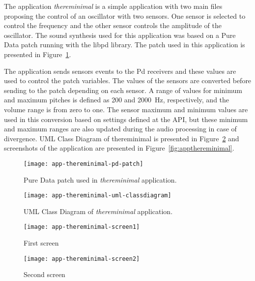 The application \textit{thereminimal} is a simple application with two main files proposing the control of an oscillator with two sensors.
One sensor is selected to control the frequency and the other sensor controls the amplitude of the oscillator.
The sound synthesis used for this application was based on a Pure Data patch running with the libpd library.
The patch used in this application is presented in Figure~\ref{fig:thereminimal-pd-patch}.

The application sends sensors events to the Pd receivers and these values are used to control the patch variables.
The values of the sensors are converted before sending to the patch depending on each sensor.
A range of values for minimum and maximum pitches is defined as 200 and 2000~Hz, respectively, and the volume range is from zero to one.
The sensor maximum and minimum values are used in this conversion based on settings defined at the API, but these minimum and maximum ranges are also updated during the audio processing in case of divergence.
UML Class Diagram of thereminimal is presented in Figure~\ref{fig:thereminimal-uml-classdiagram} and screenshots of the application are presented in Figure~\ref{fig:appthereminimal}.

\begin{figure}[!ht]
	\centering
	\texttt{[image: app-thereminimal-pd-patch]}
	\caption{Pure Data patch used in \textit{thereminimal} application.}
	\label{fig:thereminimal-pd-patch}
\end{figure}

\begin{figure}[!ht]
	\centering
	\texttt{[image: app-thereminimal-uml-classdiagram]}
	\caption{UML Class Diagram of \textit{thereminimal} application.}
	\label{fig:thereminimal-uml-classdiagram}
\end{figure}

\begin{figure*}[!ht]
	\centering
	\begin{subfigure}{.30\textwidth}
		\texttt{[image: app-thereminimal-screen1]}
		\caption{First screen}
		\label{fig:appthereminimalfirstscreen}
	\end{subfigure}
	\begin{subfigure}{.30\textwidth}
		\texttt{[image: app-thereminimal-screen2]}
		\caption{Second screen}
		\label{fig:appthereminimalsecondscreen}
	\end{subfigure}
	
	\caption{Screen-shots of \textit{thereminimal} application.}
	\label{fig:appthereminimal}
\end{figure*}

